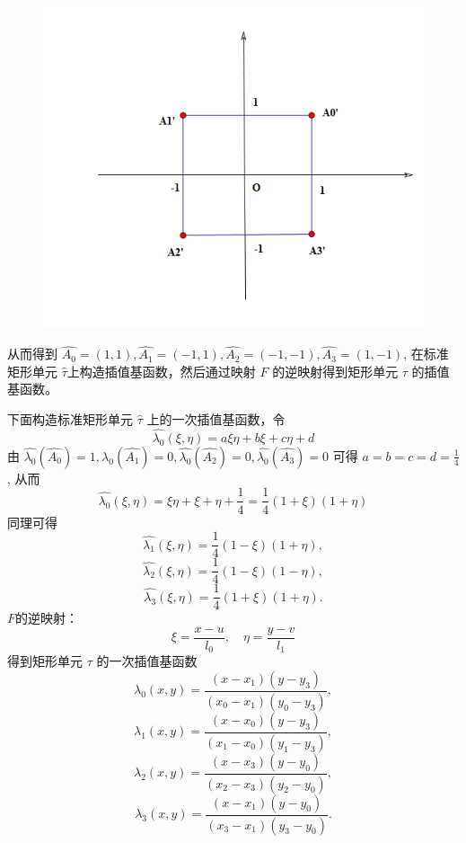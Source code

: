 \documentclass[12pt,a4paper]{article}
\begin{document}
\begin{figure}[H]
\centering
\includegraphics[scale=0.7]{./figures/6.png}
\caption{}
\end{figure}

从而得到 $\hat{A_0}=(1,1),\hat{A_1}=(-1,1),\hat{A_2}=(-1,-1),\hat{A_3}=(1,-1)$, 在标准矩形单元 $\hat{\tau}$上构造插值基函数，然后通过映射 $F$ 的逆映射得到矩形单元 $\tau$ 的插值基函数。

下面构造标准矩形单元 $\hat{\tau}$ 上的一次插值基函数，令
$$
\hat{\lambda_0} (\xi,\eta)=a\xi\eta +b\xi +c\eta +d
$$
由 $\hat{\lambda_0}(\hat{A_0})=1,\hat{\lambda_0}(\hat{A_1})=0,\hat{\lambda_0}(\hat{A_2})=0,\hat{\lambda_0}(\hat{A_3})=0$ 可得 $a=b=c=d=\frac{1}{4}$, 从而
$$
\hat{\lambda_0} (\xi,\eta)=\xi\eta +\xi +\eta +\frac{1}{4}=\frac{1}{4}(1+\xi)(1+\eta)
$$
同理可得
$$
\hat{\lambda_1} (\xi,\eta)=\frac{1}{4}(1-\xi)(1+\eta),
$$
$$
\hat{\lambda_2} (\xi,\eta)=\frac{1}{4}(1-\xi)(1-\eta),
$$
$$
\hat{\lambda_3} (\xi,\eta)=\frac{1}{4}(1+\xi)(1+\eta).
$$
$F$的逆映射：
$$
\xi=\frac{x-u}{l_0},\quad \eta=\frac{y-v}{l_1}
$$
得到矩形单元 $\tau$ 的一次插值基函数
$$
\lambda_0 (x,y)=\frac{(x-x_1)(y-y_3)}{(x_0 -x_1)(y_0 - y_3)},
$$
$$
\lambda_1 (x,y)=\frac{(x-x_0)(y-y_3)}{(x_1 -x_0)(y_1 - y_3)}, 
$$
$$
\lambda_2 (x,y)=\frac{(x-x_3)(y-y_0)}{(x_2 -x_3)(y_2 - y_0)}, 
$$
$$
\lambda_3 (x,y)=\frac{(x-x_1)(y-y_0)}{(x_3 -x_1)(y_3 - y_0)}. 
$$









%
\end{document}
